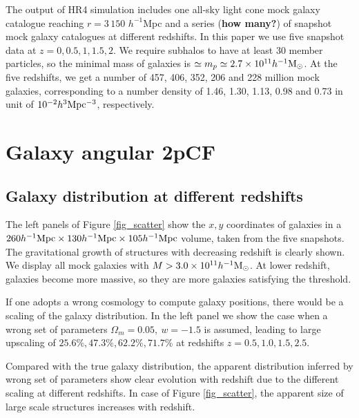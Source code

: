 \documentclass[iop]{emulateapj}
\newcommand{\hMsun}{{\ifmmode{h^{-1}{\rm
        {M_{\odot}}}}\else{$h^{-1}{\rm{M_{\odot}}}$~}\fi}}
\begin{document}
The output of HR4 simulation includes one all-sky light cone mock galaxy catalogue reaching $r=3\,150$ ${h^{-1}}$Mpc 
and a series ({\bf how many?}) of snapshot mock galaxy catalogues at different redshifts.
In this paper we use five snapshot data at $z=0,0.5,1,1.5,2$.
We require subhalos to have at least 30 member particles, 
so the minimal mass of galaxies is $\simeq m_{p} \simeq 2.7 \times 10^{11} \hMsun$.
At the five redshifts, we get a number of
457, 406, 352, 206 and 228 million mock galaxies,
corresponding to a number density of 
1.46, 1.30, 1.13, 0.98 and 0.73 in unit of $ 10^{-2} h^{3} \rm Mpc^{-3}$,
respectively.

\section{Galaxy angular 2pCF}

\subsection{Galaxy distribution at different redshifts}

The left panels of Figure \ref{fig_scatter} show the $x,y$ coordinates of galaxies in a 
$260 h^{-1} {\rm Mpc} \times 130 h^{-1} {\rm Mpc} \times 105 h^{-1} {\rm Mpc}$ volume, 
taken from the five snapshots.
The gravitational growth of structures with decreasing redshift is clearly shown.
We display all mock galaxies with $M> 3.0 \times 10^{11} \hMsun$.
At lower redshift, galaxies become more massive, so they are more galaxies satisfying the threshold.

If one adopts a wrong cosmology to compute galaxy positions, there would be a scaling of the galaxy distribution.
In the left panel we show the case when a wrong set of parameters $\Omega_m=0.05,\ w=-1.5$ is assumed,
leading to large upscaling of $25.6\%,47.3\%,62.2\%,71.7\%$ at redshifts $z=0.5,1.0,1.5,2.5$.

Compared with the true galaxy distribution, the apparent distribution inferred by wrong set of parameters
show clear evolution with redshift due to the different scaling at different redshifts.
In case of Figure \ref{fig_scatter}, the apparent size of large scale structures increases with redshift.
\end{document}
